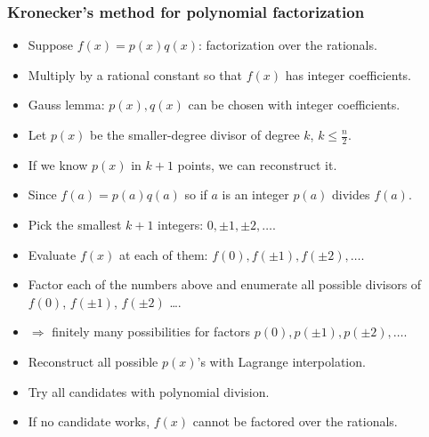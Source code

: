 \begin{frame}
\frametitle{Kronecker's method for polynomial factorization}
\begin{itemize}
\item Suppose $f(x)=p(x)q(x)$: factorization over the rationals.
\item<2-> Multiply by a rational constant so that $f(x)$ has integer coefficients.
\item<3-> Gauss lemma: $p(x), q(x)$ can be chosen with integer coefficients.
\item<4-> Let $p(x)$ be the smaller-degree divisor of degree $k$, $k\leq \frac{n}{2} $.
\item<5-> If we know $p(x)$ in $k+1$ points, we can reconstruct it.
\item<6-> Since $f(a)=p(a)q(a)$ so if $a$ is an integer $p(a)$ divides $f(a)$.

\item<7-> Pick the smallest $k+1$ integers: $0, \pm 1, \pm 2, \dots$.
\item<8-> Evaluate $f(x)$ at each of them: $f(0), f(\pm 1), f(\pm 2),\dots$.
\item<9-> Factor each of the numbers above and enumerate all possible divisors of $f(0)$, $f(\pm 1)$, $f(\pm 2)$ \dots. 
\item<10-> $\Rightarrow$ finitely many possibilities for factors $p(0), p(\pm 1), p(\pm 2), \dots $. 
\item<11-> Reconstruct all possible $p(x)$'s with Lagrange interpolation.
\item<12-> Try all candidates with polynomial division. 
\item<13-> If no candidate works, $f(x)$ cannot be factored over the rationals.
\end{itemize}
\end{frame}